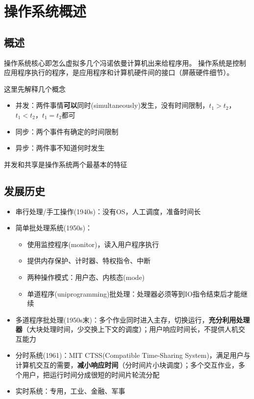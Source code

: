 
\section{操作系统概述}
\subsection{概述}
操作系统核心即怎么虚拟多几个冯诺依曼计算机出来给程序用。
操作系统是控制应用程序执行的程序，是应用程序和计算机硬件间的接口（屏蔽硬件细节）。

这里先解释几个概念
\begin{itemize}
	\item 并发：两件事情\textbf{可以}同时(simultaneously)发生，没有时间限制，$t_1>t_2$，$t_1<t_2$，$t_1=t_2$都可
	\item 同步：两个事件有确定的时间限制
	\item 异步：两件事不知道何时发生
\end{itemize}

并发和共享是操作系统两个最基本的特征


\subsection{发展历史}
\begin{itemize}
	\item 串行处理/手工操作(1940s)：没有OS，人工调度，准备时间长
	\item 简单批处理系统(1950s)：
	\begin{itemize}
		\item 使用监控程序(monitor)，读入用户程序执行
		\item 提供内存保护、计时器、特权指令、中断
		\item 两种操作模式：用户态、内核态(mode)
		\item 单道程序(uniprogramming)批处理：处理器必须等到IO指令结束后才能继续
	\end{itemize}
	\item 多道程序批处理(1950s末)：多个作业同时进入主存，切换运行，\textbf{充分利用处理器}（大块处理时间，少交换上下文的调度）；用户响应时间长，不提供人机交互能力
	\item 分时系统(1961)：MIT CTSS(Compatible Time-Sharing System)，满足用户与计算机交互的需要，\textbf{减小响应时间}（分时间片小块调度）；多个交互作业，多个用户，把运行时间分成很短的时间片轮流分配
	\item 实时系统：专用，工业、金融、军事
\end{itemize}

